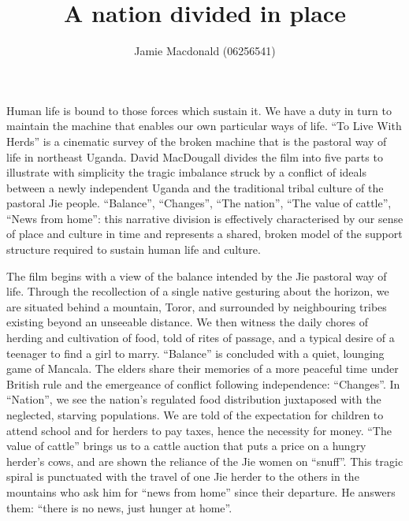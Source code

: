 \documentclass[12pt, letterpaper, oneside]{article}
\title{A nation divided in place}
\author{Jamie Macdonald (06256541)}
\begin{document}
\maketitle
Human life is bound to those forces which sustain it. We have a duty in turn to maintain the machine that enables our own particular ways of life. ``To Live With Herds'' \autocite{macdougall1972live} is a cinematic survey of the broken machine that is the pastoral way of life in northeast Uganda. David MacDougall divides the film into five parts to illustrate with simplicity the tragic imbalance struck by a conflict of ideals between a newly independent Uganda and the traditional tribal culture of the pastoral Jie people. ``Balance'', ``Changes'', ``The nation'', ``The value of cattle'', ``News from home'': this narrative division is effectively characterised by our sense of place and culture in time and represents a shared, broken model of the support structure required to sustain human life and culture.

The film begins with a view of the balance intended by the Jie pastoral way of life. Through the recollection of a single native gesturing about the horizon, we are situated behind a mountain, Toror, and surrounded by neighbouring tribes existing beyond an unseeable distance. We then witness the daily chores of herding and cultivation of food, told of rites of passage, and a typical desire of a teenager to find a girl to marry. ``Balance'' is concluded with a quiet, lounging game of Mancala. The elders share their memories of a more peaceful time under British rule and the emergeance of conflict following independence: ``Changes''. In ``Nation'', we see the nation's regulated food distribution juxtaposed with the neglected, starving populations. We are told of the expectation for children to attend school and for herders to pay taxes, hence the necessity for money. ``The value of cattle'' brings us to a cattle auction that puts a price on a hungry herder's cows, and are shown the reliance of the Jie women on ``snuff''. This tragic spiral is punctuated with the travel of one Jie herder to the others in the mountains who ask him for ``news from home'' since their departure. He answers them: ``there is no news, just hunger at home''.
\end{document}
